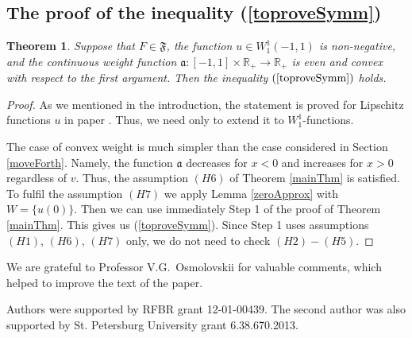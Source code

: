 \documentclass[12pt]{article}
\newcommand{\Real}{\mathbb R}
\newtheorem{thm}{Theorem}
\newcommand{\W}{W_1^1}
\begin{document}
\subsection{The proof of the inequality (\ref{toproveSymm})}
\label{sobolevSymm}

\begin{thm}
\label{symmThm}
Suppose that $F \in \mathfrak{F}$, the function $u \in \W(-1, 1)$ is non-negative,
and the continuous weight function $\mathfrak a: [-1, 1] \times \Real_+ \to \Real_+$
is even and convex with respect to the first argument.
Then the inequality $(\ref{toproveSymm})$ holds.
\end{thm}

\begin{proof}
As we mentioned in the introduction,
the statement is proved for Lipschitz functions $u$ in paper \cite{Br}.
Thus, we need only to extend it to $\W$-functions.

The case of convex weight is much simpler than the case considered in Section \ref{moveForth}.
Namely, the function $\mathfrak a$ decreases for $x < 0$ and increases for $x > 0$ regardless of $v$.
Thus, the assumption $(H6)$ of Theorem \ref{mainThm} is satisfied.
To fulfil the assumption $(H7)$ we apply Lemma \ref{zeroApprox} with $W = \{ u(0) \}$.
Then we can use immediately Step 1 of the proof of Theorem \ref{mainThm}.
This gives us (\ref{toproveSymm}).
Since Step 1 uses assumptions $(H1)$, $(H6)$, $(H7)$ only,
we do not need to check $(H2)-(H5)$.
\end{proof}

\vskip 40pt

We are grateful to Professor V.G.~Osmolovskii for valuable comments,
which helped to improve the text of the paper.

Authors were supported by RFBR grant 12-01-00439.
The second author was also supported by St. Petersburg University grant 6.38.670.2013.
\end{document}
